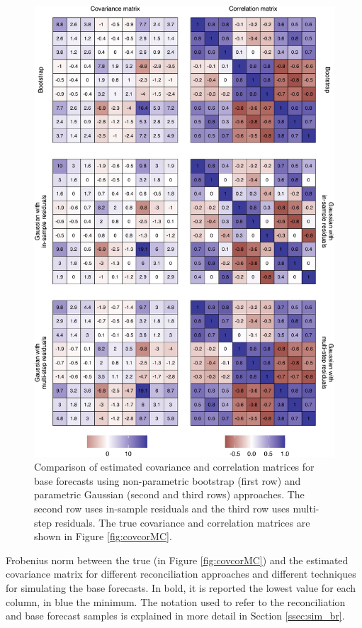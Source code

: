 \documentclass[a4paper,11pt]{article}
\theoremstyle{definition}
\begin{document}
\begin{figure}[p]
\centering
\includegraphics[width = 0.9\linewidth]{fig/simAR/base_cov.pdf}
\caption{Comparison of estimated covariance and correlation matrices for base forecasts using non-parametric bootstrap (first row) and parametric Gaussian (second and third rows) approaches. The second row uses in-sample residuals and the third row uses multi-step residuals. The true covariance and correlation matrices are shown in Figure \ref{fig:covcorMC}.}
\label{fig:ar2covcor}
\end{figure}


\begin{table}[t]
\centering
\fontsize{9}{11}\selectfont

\caption{Frobenius norm between the true (in Figure \ref{fig:covcorMC}) and the estimated covariance matrix for different reconciliation approaches and different techniques for simulating the base forecasts. In bold, it is reported the lowest value for each column, in blue the minimum.  The notation used to refer to the reconciliation and base forecast samples is explained in more detail in Section \ref{ssec:sim_br}.}
\label{tab:ar2norm}
\end{table}
\end{document}
